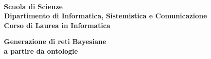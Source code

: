 \documentclass[a4paper,12pt,openright,oneside]{book}
\begin{document}
\frontmatter
\begin{titlepage}
	\noindent
	\begin{minipage}[t]{0.18\textwidth}
	\end{minipage}
	\begin{minipage}[t]{0.82\textwidth}
		{
			 \\
			\textbf{Scuola di Scienze} \\
			\textbf{Dipartimento di Informatica, Sistemistica e Comunicazione} \\
			\textbf{Corso di Laurea in Informatica} \\
			\par
		}
	\end{minipage}
	
	\vspace{40mm}
	
	\begin{center}
		{\LARGE{
				\textbf{Generazione di reti Bayesiane \\ a partire da ontologie}
				\par
		}}
	\end{center}
	

\end{titlepage}
\end{document}
